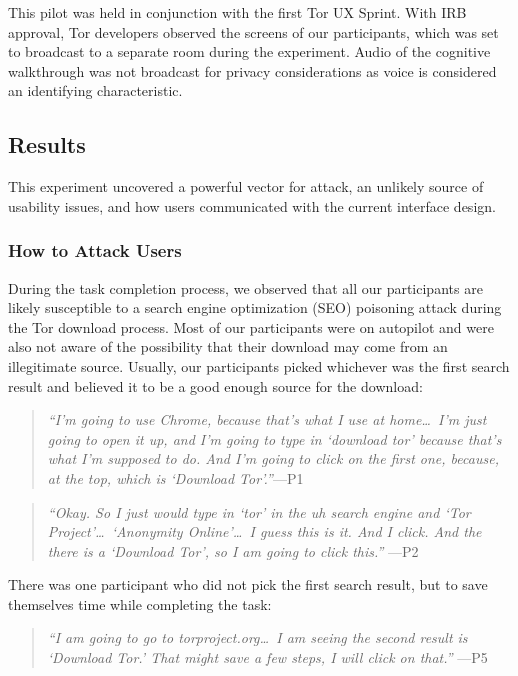 \documentclass[letterpaper,twocolumn,11pt]{article}
\begin{document}
This pilot was held in conjunction with the first Tor UX Sprint. With IRB approval, Tor developers
observed the screens of our participants, which was set to broadcast to a separate  
room during the experiment. Audio of the cognitive walkthrough was not broadcast for privacy
considerations as voice is considered an identifying characteristic.

\subsection{Results}
\indent \indent This experiment uncovered a powerful vector for attack, an unlikely source
of usability issues, and how users communicated with the current interface design.

\subsubsection{How to Attack Users}
During the task completion process, we observed that all our participants are likely 
susceptible to a search engine optimization (SEO) poisoning attack during the 
Tor download process. Most of our  participants were on autopilot and 
were also not aware of the possibility that their download may come from an 
illegitimate source. Usually, our participants picked whichever was the first search
result and believed it to be a good enough source for the download: 

\begin{quote}{\it
``I'm going to use Chrome, because that's what I use at home\ldots\ 
I'm just going to open it up, and I'm going to type in `download tor' because 
that's what I'm supposed to do. And I'm going to click on the first one, because,
at the top, which is `Download Tor'.''}\mbox{---P1}
\end{quote}

\begin{quote}{\it
``Okay. So I just would type in `tor' in the uh search engine and `Tor Project'\ldots\ 
`Anonymity Online'\ldots\ I guess this is it. And I click. And the there is a `Download Tor', 
so I am going to click this.''} \mbox{---P2}
\end{quote}

There was one participant who did not pick the first search result, but to save themselves
time while completing the task: 

\begin{quote}{\it
``I am going to go to torproject.org\ldots\ I am seeing the second result is `Download Tor.'
That might save a few steps, I will click on that.''} \mbox{---P5}
\end{quote}
\end{document}
